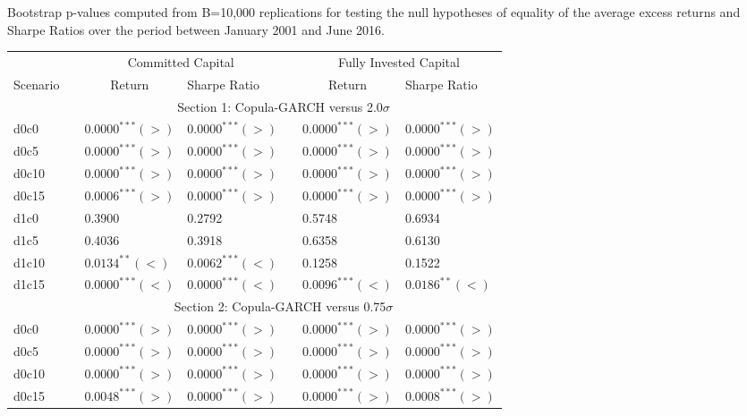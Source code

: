\documentclass[a4paper,12pt]{report}
\begin{document}
\vspace{0.3cm}

\begin{threeparttable}[H]
	\centering \scriptsize
	\caption{Bootstrap p-values computed from B=10,000 replications for testing the null hypotheses of equality of the average excess returns and Sharpe Ratios over the period between January 2001 and June 2016.}
	\begin{tabularx}{\textwidth}{@{\extracolsep{\fill}}lllllll@{}}
		\toprule
		& & \multicolumn{2}{c}{Committed Capital} & \multicolumn{1}{c}{} & \multicolumn{2}{c}{Fully Invested Capital} \\
		\cmidrule{3-4}  \cmidrule{6-7}
		\multicolumn{1}{c}{Scenario} & & \multicolumn{1}{c}{Return} & Sharpe Ratio &       & \multicolumn{1}{c}{Return}& Sharpe Ratio \\
		\midrule
		& \multicolumn{6}{c}{Section 1: Copula-GARCH versus 2.0$\sigma$} \\
		\midrule
		d0c0 & & $0.0000^{***}(>)$ & $0.0000^{***}(>)$ &       & $0.0000^{***}(>)$ & $0.0000^{***}(>)$ \\
		d0c5 & & $0.0000^{***}(>)$ & $0.0000^{***}(>)$ &       & $0.0000^{***}(>)$ & $0.0000^{***}(>)$   \\
		d0c10 & & $0.0000^{***}(>)$ & $0.0000^{***}(>)$ &       & $0.0000^{***}(>)$ & $0.0000^{***}(>)$ \\
		d0c15 & & $0.0006^{***}(>)$ & $0.0000^{***}(>)$ &       & $0.0000^{***}(>)$ & $0.0000^{***}(>)$ \\
		d1c0 & & 0.3900 & 0.2792  &       & 0.5748 & 0.6934 \\
		d1c5 & & 0.4036 & 0.3918 &       & 0.6358 & 0.6130 \\
		d1c10 & & $0.0134^{**}(<)$ & $0.0062^{***}(<)$ &       & 0.1258 & 0.1522 \\
		d1c15 & & $0.0000^{***}(<)$ & $0.0000^{***}(<)$ &       & $0.0096^{***}(<)$ & $0.0186^{**}(<)$ \\
		\midrule
		& \multicolumn{6}{c}{Section 2: Copula-GARCH versus 0.75$\sigma$} \\
		\midrule
		d0c0 & & $0.0000^{***}(>)$ & $0.0000^{***}(>)$ &       & $0.0000^{***}(>)$ & $0.0000^{***}(>)$ \\
		d0c5 & & $0.0000^{***}(>)$ & $0.0000^{***}(>)$ &       & $0.0000^{***}(>)$ & $0.0000^{***}(>)$   \\
		d0c10 & & $0.0000^{***}(>)$ & $0.0000^{***}(>)$ &       & $0.0000^{***}(>)$ & $0.0000^{***}(>)$ \\
		d0c15 & & $0.0048^{***}(>)$ & $0.0000^{***}(>)$ &       & $0.0000^{***}(>)$ & $0.0008^{***}(>)$ \\

\end{tabularx}
\end{threeparttable}
\end{document}

